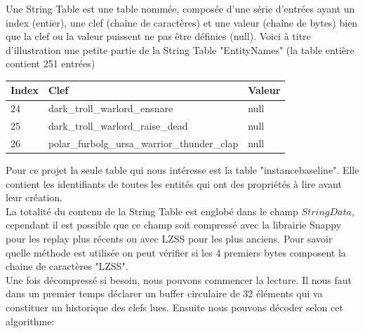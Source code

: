\documentclass{article}
\begin{document}
Une String Table est une table nommée, composée d'une série d'entrées ayant un index (entier), une clef (chaîne de caractères) et une valeur (chaîne de bytes) bien que la clef ou la valeur puissent ne pas être définies (null). Voici à titre d'illustration une petite partie de la String Table "EntityNames" (la table entière contient 251 entrées)
\begin{center}
	\begin{tabular}{| l | l | l |}
  	 \hline
  		 Index & Clef & Valeur\\
  	 \hline
 	  	 24 & dark\_troll\_warlord\_ensnare & null  \\
  		 25 & dark\_troll\_warlord\_raise\_dead & null \\
  		 26 & polar\_furbolg\_ursa\_warrior\_thunder\_clap & null \\
   	\hline
	\end{tabular}
\end{center}

Pour ce projet la seule table qui nous intéresse est la table "instancebaseline". Elle contient les identifiants de toutes les entités qui ont des propriétés à lire avant leur création.\\

La totalité du contenu de la String Table est englobé dans le champ $StringData$, cependant il est possible que ce champ soit compressé avec la librairie Snappy pour les replay plus récents ou avec LZSS pour les plus anciens. Pour savoir quelle méthode est utilisée on peut vérifier si les 4 premiers bytes composent la chaine de caractères "LZSS".\\
Une fois décompressé si besoin, nous pouvons commencer la lecture. Il nous faut dans un premier temps déclarer un buffer circulaire de 32 éléments qui va constituer un historique des clefs lues. Ensuite nous pouvons décoder selon cet algorithme:\\
\end{document}

